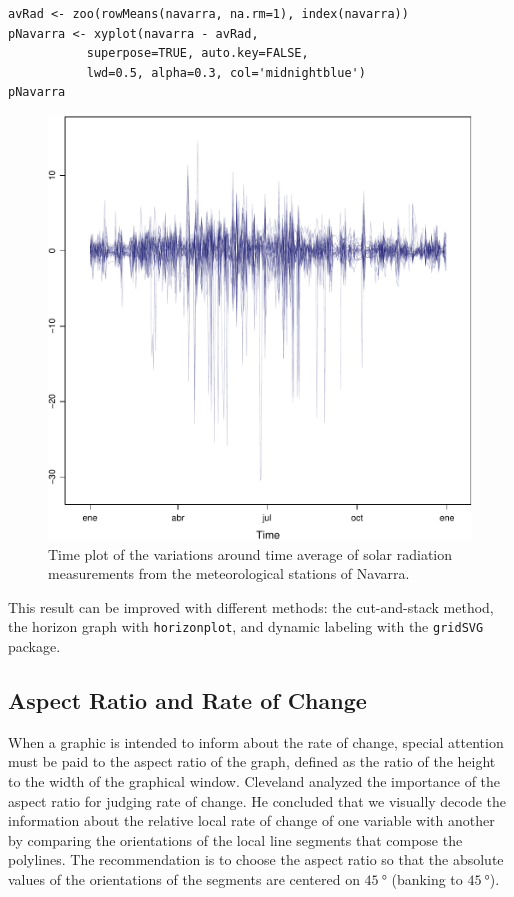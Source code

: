 
\lstset{language=R,numbers=none}
\begin{lstlisting}
avRad <- zoo(rowMeans(navarra, na.rm=1), index(navarra))
pNavarra <- xyplot(navarra - avRad,
		   superpose=TRUE, auto.key=FALSE,
		   lwd=0.5, alpha=0.3, col='midnightblue') 
pNavarra
\end{lstlisting}

\begin{figure}[htb]
\centering
\includegraphics[width=.9\linewidth]{figs/navarra.pdf}
\caption{\label{fig:navarraNaive}Time plot of the variations around time average of solar radiation measurements from the meteorological stations of Navarra.}
\end{figure}

This result can be improved with different methods: the cut-and-stack
method, the horizon graph with \texttt{horizonplot}, and dynamic labeling
with the \texttt{gridSVG} package.

\subsection{Aspect Ratio and Rate of Change}
\label{sec-2-1}
When a graphic is intended to inform about the rate of change,
special attention must be paid to the aspect ratio of the graph,
defined as the ratio of the height to the width of the graphical
window. Cleveland analyzed the importance of the aspect ratio for
judging rate of change. He concluded that we visually decode the
information about the relative local rate of change of one
variable with another by comparing the orientations of the local
line segments that compose the polylines. The recommendation is to
choose the aspect ratio so that the absolute values of the
orientations of the segments are centered on $\SI{45}{\degree}$ (banking
to $\SI{45}{\degree}$). 

